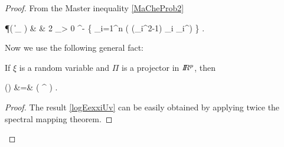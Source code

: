 \begin{proof}
From the Master inequality \eqref{MaCheProb2} %
\begin{EQA}
\label{matrix_chernoff}
	\P\bigl( 
		\| \Zv \|_{\oper}
		\geq 
		\zq
	\bigr)
	& \leq &
	2 \inf_{\theta> 0} \ex^{-\theta \zq} 
		\tr \exp \biggl\{ 
		\sum_{i=1}^{n} \log \E\exp( \theta (\eps_{i}^{2}-1) \uv_{i} \uv_{i}^{\T}) 
	\biggr\} .
\end{EQA}
Now we use the following general fact:

\begin{lemma}
\label{LlEexiUv}
If \( \xi \) is a random variable and \( \Pi \) is a projector in \( I\!\!R^{p} \), then 
\begin{EQA}
	\log \E \exp(\xi \Pi) 
	&=&
	\log \bigl( \E \ex^{\xi} \bigr) \Pi .
\label{logEexxiUv}
\end{EQA}
\end{lemma}
\begin{proof}
The result \eqref{logEexxiUv} can be easily obtained by applying twice the spectral mapping theorem. 
\end{proof}


\end{proof}
